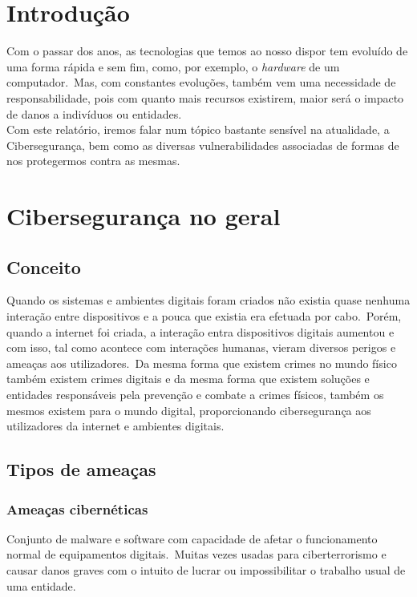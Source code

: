 \documentclass{report}
\begin{document}
\tableofcontents


\clearpage
{}

\chapter*{Introdução}
\label{ch:introducao}

Com o passar dos anos, as tecnologias que temos ao nosso dispor tem evoluído de uma forma rápida e sem fim, como, por exemplo, o \textit{hardware} de um computador.\ Mas, com constantes evoluções, também vem uma necessidade de responsabilidade, pois com quanto mais recursos existirem, maior será o impacto de danos a indivíduos ou entidades.\\

Com este relatório, iremos falar num tópico bastante sensível na atualidade, a Cibersegurança, bem como as diversas vulnerabilidades associadas de formas de nos protegermos contra as mesmas.

\chapter{Cibersegurança no geral}
\label{ch:ciberseguranca-no-geral}
\section{Conceito}
Quando os sistemas e ambientes digitais foram criados não existia quase nenhuma interação entre dispositivos e a pouca que existia era efetuada por cabo.\ Porém, quando a internet foi criada, a interação entra dispositivos digitais aumentou e com isso, tal como acontece com interações humanas, vieram diversos perigos e ameaças aos utilizadores.\ Da mesma forma que existem crimes no mundo físico também existem crimes digitais e da mesma forma que existem soluções e entidades responsáveis pela prevenção e combate a crimes físicos, também os mesmos existem para o mundo digital, proporcionando cibersegurança aos utilizadores da internet e ambientes digitais.

\section{Tipos de ameaças}
\subsection{Ameaças cibernéticas}
Conjunto de malware e software com capacidade de afetar o funcionamento normal de equipamentos digitais.\ Muitas vezes usadas para ciberterrorismo e causar danos graves com o intuito de lucrar ou impossibilitar o trabalho usual de uma entidade.\\
\end{document}
